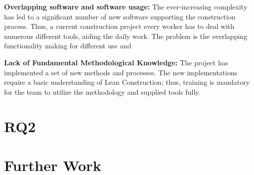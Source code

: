 {\bf Overlapping software and software usage:} The ever-increasing complexity has led to a significant number of new software supporting the construction process. Thus, a current construction project every worker has to deal with numerous different tools, aiding the daily work. The problem is the overlapping functionality making for different use and 
    
{\bf Lack of Fundamental Methodological Knowledge:} The project has implemented a set of new methods and processes. The new implementations require a basic understanding of Lean Construction; thus, training is mandatory for the team to utilize the methodology and supplied tools fully. 

\section{RQ2} \label{sec:rq2}

\section{Further Work} \label{sec:further_research}


\cleardoublepage